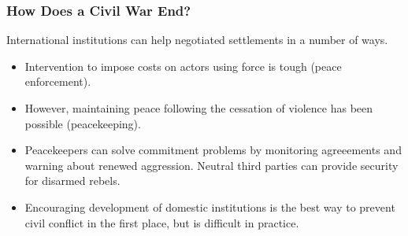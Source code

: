 \documentclass{beamer}
\begin{document}
\begin{frame} 
	\frametitle{\LARGE{How Does a Civil War End?}}
International institutions can help negotiated settlements in a number of ways. \pause 
	\begin{itemize}
		\item Intervention to impose costs on actors using force is tough (peace enforcement). \pause 
		\item However, maintaining peace following the cessation of violence has been possible (peacekeeping). \pause
		\item Peacekeepers can solve commitment problems by monitoring agreeements and warning about renewed aggression. Neutral third parties can provide security for disarmed rebels. \pause
		\item Encouraging development of domestic institutions is the best way to prevent civil conflict in the first place, but is difficult in practice.
	\end{itemize}
\end{frame}
\end{document}
